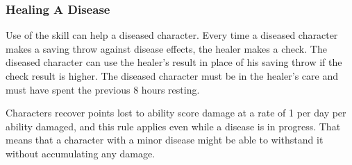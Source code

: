 
\subsubsection{Healing A Disease}
Use of the  skill can help a diseased character. Every time a diseased character makes a saving throw against disease effects, the healer makes a check. The diseased character can use the healer's result in place of his saving throw if the  check result is higher. The diseased character must be in the healer's care and must have spent the previous 8 hours resting.

Characters recover points lost to ability score damage at a rate of 1 per day per ability damaged, and this rule applies even while a disease is in progress. That means that a character with a minor disease might be able to withstand it without accumulating any damage.